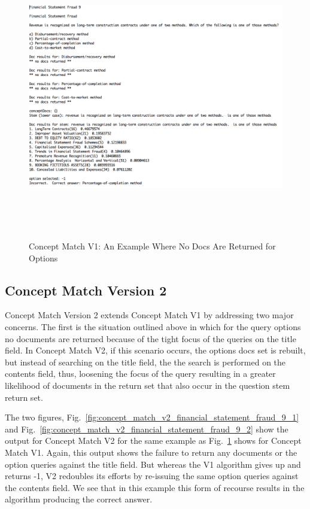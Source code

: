 \begin{figure}
\centering
\vspace{1.0in}
\includegraphics[width=125mm, height=125mm]{concept_match_v1_financial_statement_fraud_9.png}
\caption{Concept Match V1: An Example Where No Docs Are Returned for Options}
\label{fig:concept_match_v1_financial_statement_fraud_9}
\end{figure}


\subsection{Concept Match Version 2}

Concept Match Version 2 extends Concept Match V1 by addressing two major concerns.  The first is the situation outlined above in which for the query options no documents are returned because of the tight focus of the queries on the title field.  In Concept Match V2, if this scenario occurs, the options docs set is rebuilt, but instead of searching on the title field, the the search is performed on the contents field, thus, loosening the focus of the query resulting in a greater likelihood of documents in the return set that also occur in the question stem return set.  

The two figures, Fig.~\ref{fig:concept_match_v2_financial_statement_fraud_9_1} and Fig.~\ref{fig:concept_match_v2_financial_statement_fraud_9_2}  show the output for Concept Match V2 for the same example as  Fig.~\ref{fig:concept_match_v1_financial_statement_fraud_9} shows for Concept Match V1.  Again, this output shows the failure to return any documents or the option queries against the title field.  But whereas the V1 algorithm gives up and returns -1, V2 redoubles its efforts by re-issuing the same option queries against the contents field.  We see that in this example this form of recourse results in the algorithm producing the correct answer.

